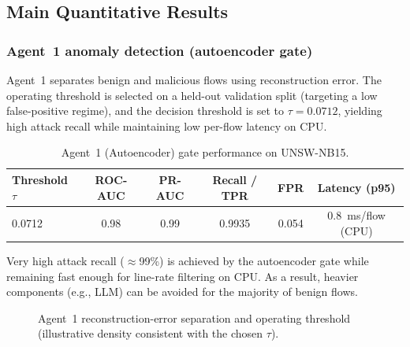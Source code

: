 \documentclass[conference]{IEEEtran}
\begin{document}
 
\subsection{Main Quantitative Results}
\label{sec:main-results}

\subsubsection{Agent~1 anomaly detection (autoencoder gate)}
Agent~1 separates benign and malicious flows using reconstruction error. The operating threshold is selected on a held-out validation split (targeting a low false-positive regime), and the decision threshold is set to $\tau=0.0712$, yielding high attack recall while maintaining low per-flow latency on CPU.

\begin{table}[t]
\caption{Agent~1 (Autoencoder) gate performance on UNSW-NB15.}
\label{tab:agent1_main}
\centering
\begin{tabular}{lccccc}
\toprule
\textbf{Threshold $\tau$} & \textbf{ROC-AUC} & \textbf{PR-AUC} & \textbf{Recall / TPR} & \textbf{FPR} & \textbf{Latency (p95)}\\
\midrule
0.0712 & 0.98 & 0.99 & 0.9935 & 0.054 & \SI{0.8}{\milli\second}/flow (CPU)\\
\bottomrule
\end{tabular}
\end{table}

Very high attack recall (\(\approx\)99\%) is achieved by the autoencoder gate while remaining fast enough for line-rate filtering on CPU. As a result, heavier components (e.g., LLM) can be avoided for the majority of benign flows.

\begin{figure}[t]
\centering
{}
\caption{Agent~1 reconstruction-error separation and operating threshold (illustrative density consistent with the chosen $\tau$).}
\label{fig:recon_dist}
\end{figure}
\end{document}
